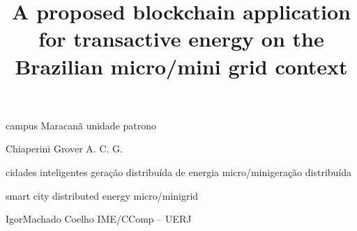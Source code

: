 
            {campus Maracanã} 
            {unidade} 
            {patrono} 

      {Chiaperini Grover}
      {A. C. G.}

\title{A proposed blockchain application for transactive energy on the Brazilian micro/mini grid context}
         {cidades inteligentes}
         {geração distribuída de energia}
         {micro/minigeração distribuída}

               {smart city}
               {distributed energy}
               {micro/minigrid}

           {Igor}{Machado Coelho} 
           {IME/CComp -- UERJ} 




